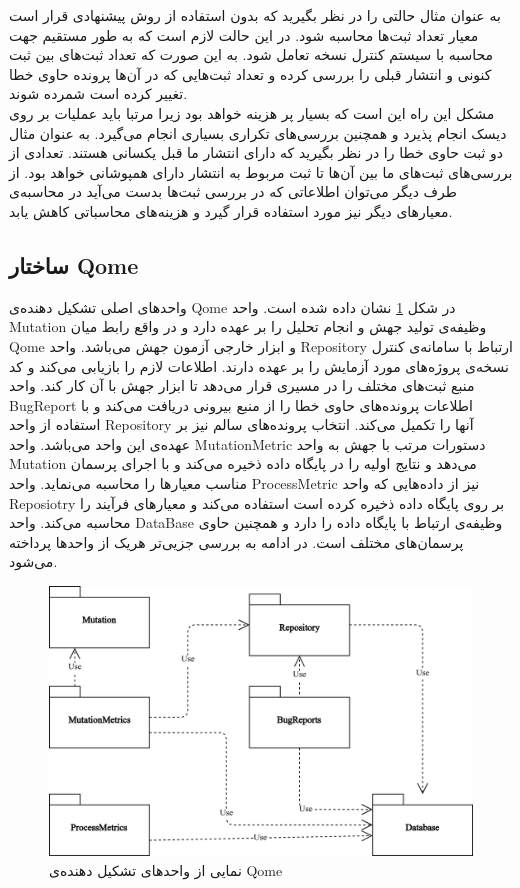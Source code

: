 به عنوان مثال حالتی را در نظر بگیرید که  بدون استفاده از روش پیشنهادی  قرار است معیار تعداد ثبت‌ها محاسبه شود. در این حالت لازم است که به طور مستقیم جهت محاسبه با سیستم کنترل نسخه تعامل شود.  به این صورت که تعداد ثبت‌های بین ثبت کنونی و انتشار قبلی  را بررسی کرده و تعداد  ثبت‌هایی که در آن‌ها پرونده حاوی خطا تغییر کرده است شمرده شوند.\\ مشکل این راه این است که بسیار پر هزینه  خواهد بود زیرا مرتبا باید عملیات  بر روی دیسک انجام پذیرد و همچنین بررسی‌های تکراری بسیاری انجام می‌گیرد. به عنوان مثال دو ثبت حاوی خطا را در نظر بگیرید که دارای انتشار ما قبل یکسانی هستند. تعدادی از بررسی‌های ثبت‌های ما بین آن‌ها تا ثبت مربوط به انتشار دارای همپوشانی خواهد بود. از طرف دیگر می‌توان اطلاعاتی که در بررسی ثبت‌ها بدست می‌آید در محاسبه‌ی معیارهای دیگر نیز مورد استفاده قرار گیرد و هزینه‌های محاسباتی کاهش یابد. 

\subsection{ساختار Qome}
واحدهای اصلی تشکیل دهنده‌ی Qome در شکل \ref{fig:jpredict-module} نشان داده شده‌ است. واحد Mutation وظیفه‌ی تولید جهش و انجام تحلیل را بر عهده دارد و در واقع رابط میان Qome و ابزار  خارجی آزمون جهش می‌باشد. واحد Repository ارتباط با سامانه‌ی کنترل نسخه‌ی پروژه‌های مورد آزمایش را بر عهده دارند. اطلاعات لازم را بازیابی می‌کند و کد منبع ثبت‌های مختلف را در مسیری قرار می‌دهد تا ابزار جهش با آن کار کند. واحد BugReport اطلاعات پرونده‌های حاوی خطا را از منبع بیرونی دریافت می‌کند و با استفاده از واحد Repository آنها را تکمیل می‌کند.  انتخاب پرونده‌های سالم نیز بر عهده‌ی این واحد می‌باشد. واحد MutationMetric دستورات مرتب با جهش به واحد Mutation می‌دهد و نتایج اولیه را در پایگاه داده ذخیره می‌کند و با اجرای پرسمان مناسب معیارها را محاسبه می‌نماید. واحد ProcessMetric نیز  از داده‌هایی که واحد Reposiotry بر روی پایگاه داده ذخیره کرده است استفاده می‌کند و معیارهای فرآیند را محاسبه می‌کند. واحد DataBase وظیفه‌ی ارتباط با پایگاه داده‌ را دارد و همچنین حاوی پرسمان‌های مختلف است. در ادامه به بررسی جزیی‌تر هریک از واحدها پرداخته می‌شود.


\begin{figure}[H]
	\centering
	\includegraphics[width=.8\textwidth]{img/method/component-jpredict.png}
	\caption{ نمایی از واحدهای تشکیل دهنده‌ی Qome}
	\label{fig:jpredict-module}
\end{figure}

